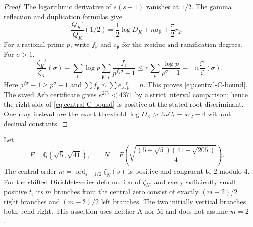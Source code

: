 \begin{proof}
The logarithmic derivative of $s(s-1)$ vanishes at $1/2$.
The gamma reflection and duplication formulas give
\[
 \frac{Q_K'}{Q_K}(1/2)=\frac12\log D_K
                   +na_{\mathbb R}+\frac\pi2r_2.
\]
For a rational prime $p$, write $f_{\mathfrak p}$ and
$e_{\mathfrak p}$ for the residue and ramification degrees.
For $\sigma>1$,
\[
 -\frac{\zeta_K'}{\zeta_K}(\sigma)
 =\sum_p\log p\sum_{\mathfrak p\mid p}
       \frac{f_{\mathfrak p}}{p^{f_{\mathfrak p}\sigma}-1}
 \le n\sum_p\frac{\log p}{p^\sigma-1}
 =-n\frac{\zeta'}{\zeta}(\sigma).
\]
Here $p^{f\sigma}-1\ge p^\sigma-1$ and
$\sum f_{\mathfrak p}\le\sum e_{\mathfrak p}f_{\mathfrak p}=n$.
This proves \eqref{eq:central-C-bound}. The saved Arb certificate
gives $e^{2C_*}<4371$ by a strict interval comparison; hence the
right side of \eqref{eq:central-C-bound} is positive at the stated
root discriminant. One may instead use the exact threshold
$\log D_K>2nC_*-\pi r_2-4$ without decimal constants.
\end{proof}

\begin{corollary}
Let
\[
 F=\mathbb Q(\sqrt5,\sqrt{41}),\qquad
 N=F\left(\sqrt{\frac{(5+\sqrt5)(41+\sqrt{205})}{4}}\right).
\]
The central order $m=\operatorname{ord}_{s=1/2}\zeta_N(s)$ is
positive and congruent to $2$ modulo $4$. For the shifted
Dirichlet-series deformation of $\zeta_N$, and every sufficiently
small positive $t$, its $m$ branches from the central zero consist
of exactly $(m+2)/2$ right branches and $(m-2)/2$ left branches.
The two initially vertical branches both bend right. This assertion
uses neither A nor M and does not assume $m=2$.
\end{corollary}

